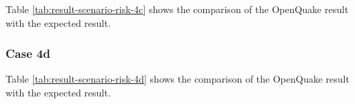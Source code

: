

Table \ref{tab:result-scenario-risk-4c} shows the comparison of the OpenQuake result with the expected result.

\subsubsection{Case 4d}




Table \ref{tab:result-scenario-risk-4d} shows the comparison of the OpenQuake result with the expected result.
